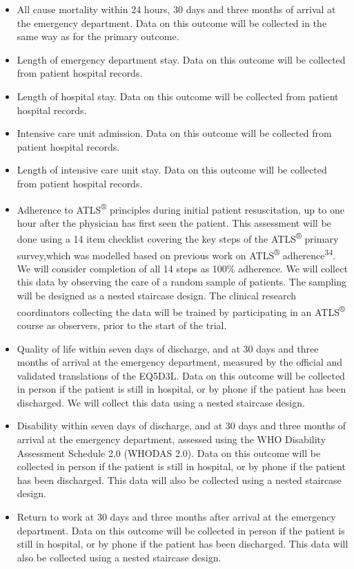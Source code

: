 \documentclass[
]{scrartcl}
\providecommand{\tightlist}{%
  \setlength{\itemsep}{0pt}\setlength{\parskip}{0pt}}\usepackage{longtable,booktabs,array}
\begin{document}
\begin{itemize}
\tightlist
\item
  All cause mortality within 24 hours, 30 days and three months of
  arrival at the emergency department. Data on this outcome will be
  collected in the same way as for the primary outcome.
\item
  Length of emergency department stay. Data on this outcome will be
  collected from patient hospital records.
\item
  Length of hospital stay. Data on this outcome will be collected from
  patient hospital records.
\item
  Intensive care unit admission. Data on this outcome will be collected
  from patient hospital records.
\item
  Length of intensive care unit stay. Data on this outcome will be
  collected from patient hospital records.
\item
  Adherence to ATLS\textsuperscript{®} principles during initial patient
  resuscitation, up to one hour after the physician has first seen the
  patient. This assessment will be done using a 14 item checklist
  covering the key steps of the ATLS\textsuperscript{®} primary
  survey,which was modelled based on previous work on
  ATLS\textsuperscript{®} adherence\textsuperscript{34}. We will
  consider completion of all 14 steps as 100\% adherence. We will
  collect this data by observing the care of a random sample of
  patients. The sampling will be designed as a nested staircase design.
  The clinical research coordinators collecting the data will be trained
  by participating in an ATLS\textsuperscript{®} course as observers,
  prior to the start of the trial.
\item
  Quality of life within seven days of discharge, and at 30 days and
  three months of arrival at the emergency department, measured by the
  official and validated translations of the EQ5D3L. Data on this
  outcome will be collected in person if the patient is still in
  hospital, or by phone if the patient has been discharged. We will
  collect this data using a nested staircase design.
\item
  Disability within seven days of discharge, and at 30 days and three
  months of arrival at the emergency department, assessed using the WHO
  Disability Assessment Schedule 2.0 (WHODAS 2.0). Data on this outcome
  will be collected in person if the patient is still in hospital, or by
  phone if the patient has been discharged. This data will also be
  collected using a nested staircase design.
\item
  Return to work at 30 days and three months after arrival at the
  emergency department. Data on this outcome will be collected in person
  if the patient is still in hospital, or by phone if the patient has
  been discharged. This data will also be collected using a nested
  staircase design.
\end{itemize}
\end{document}
